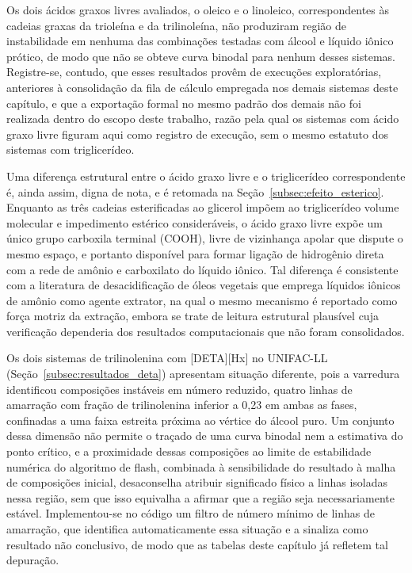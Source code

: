 Os dois ácidos graxos livres avaliados, o oleico e o linoleico, correspondentes às cadeias graxas da trioleína e da trilinoleína, não produziram região de instabilidade em nenhuma das combinações testadas com álcool e líquido iônico prótico, de modo que não se obteve curva binodal para nenhum desses sistemas. Registre-se, contudo, que esses resultados provêm de execuções exploratórias, anteriores à consolidação da fila de cálculo empregada nos demais sistemas deste capítulo, e que a exportação formal no mesmo padrão dos demais não foi realizada dentro do escopo deste trabalho, razão pela qual os sistemas com ácido graxo livre figuram aqui como registro de execução, sem o mesmo estatuto dos sistemas com triglicerídeo.

Uma diferença estrutural entre o ácido graxo livre e o triglicerídeo correspondente é, ainda assim, digna de nota, e é retomada na Seção~\ref{subsec:efeito_esterico}. Enquanto as três cadeias esterificadas ao glicerol impõem ao triglicerídeo volume molecular e impedimento estérico consideráveis, o ácido graxo livre expõe um único grupo carboxila terminal (COOH), livre de vizinhança apolar que dispute o mesmo espaço, e portanto disponível para formar ligação de hidrogênio direta com a rede de amônio e carboxilato do líquido iônico. Tal diferença é consistente com a literatura de desacidificação de óleos vegetais que emprega líquidos iônicos de amônio como agente extrator, na qual o mesmo mecanismo é reportado como força motriz da extração, embora se trate de leitura estrutural plausível cuja verificação dependeria dos resultados computacionais que não foram consolidados.

Os dois sistemas de trilinolenina com [DETA][Hx] no UNIFAC-LL (Seção~\ref{subsec:resultados_deta}) apresentam situação diferente, pois a varredura identificou composições instáveis em número reduzido, quatro linhas de amarração com fração de trilinolenina inferior a 0,23 em ambas as fases, confinadas a uma faixa estreita próxima ao vértice do álcool puro. Um conjunto dessa dimensão não permite o traçado de uma curva binodal nem a estimativa do ponto crítico, e a proximidade dessas composições ao limite de estabilidade numérica do algoritmo de flash, combinada à sensibilidade do resultado à malha de composições inicial, desaconselha atribuir significado físico a linhas isoladas nessa região, sem que isso equivalha a afirmar que a região seja necessariamente estável. Implementou-se no código um filtro de número mínimo de linhas de amarração, que identifica automaticamente essa situação e a sinaliza como resultado não conclusivo, de modo que as tabelas deste capítulo já refletem tal depuração.

